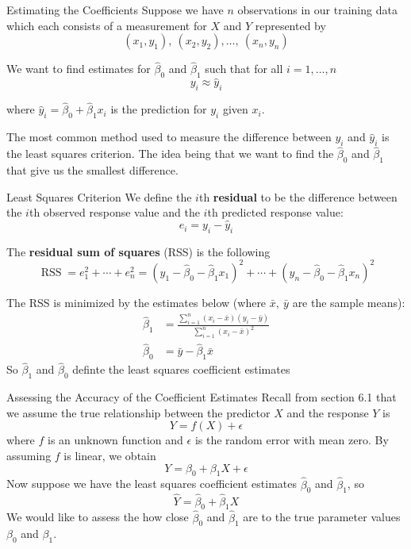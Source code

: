 \documentclass[
  ignorenonframetext,
  aspectratio=169,
]{beamer}
\begin{document}
\begin{frame}{Estimating the Coefficients}
\protect\hypertarget{estimating-the-coefficients}{}
Suppose we have \(n\) observations in our training data which each
consists of a measurement for \(X\) and \(Y\) represented by \[
(x_1, y_1),\ (x_2, y_2), \dots,\ (x_n, y_n)
\]

We want to find estimates for \(\hat \beta_0\) and \(\hat \beta_1\) such
that for all \(i = 1, \dots, n\) \[
y_i \approx \hat y_i
\]

where \(\hat y_i = \hat \beta_0 + \hat \beta_1 x_i\) is the prediction
for \(y_i\) given \(x_i\).

The most common method used to measure the difference between \(y_i\)
and \(\hat y_i\) is the least squares criterion. The idea being that
\alert{we want to find the $\hat \beta_0$ and $\hat \beta_1$ that give us the smallest difference}.
\end{frame}

\begin{frame}{Least Squares Criterion}
\protect\hypertarget{least-squares-criterion}{}
We define the \(i\)th \textbf{residual} to be the difference between the
\(i\)th observed response value and the \(i\)th predicted response
value: \[
e_i = y_i - \hat y_i
\]

The \textbf{residual sum of squares} (RSS) is the following \[
\operatorname{RSS} = e_1^2 + \cdots + e_n^2 
= \left(y_{1}-\hat{\beta}_{0}-\hat{\beta}_{1} x_{1}\right)^{2}+\cdots+\left(y_{n}-\hat{\beta}_{0}-\hat{\beta}_{1} x_{n}\right)^{2}
\]

\begin{block}{The RSS is minimized by the estimates below (where
\(\bar{x},\ \bar{y}\) are the sample means):}
\protect\hypertarget{the-rss-is-minimized-by-the-estimates-below-where-barx-bary-are-the-sample-means}{}
\[
\begin{aligned}
\hat{\beta}_{1}&=\frac{\sum_{i=1}^{n}\left(x_{i}-\bar{x}\right)\left(y_{i}-\bar{y}\right)}{\sum_{i=1}^{n}\left(x_{i}-\bar{x}\right)^{2}} \\
\hat{\beta}_{0}&=\bar{y}-\hat{\beta}_{1} \bar{x}
\end{aligned}
\]
\alert{So $\hat \beta_1$ and $\hat \beta_0$ definte the least squares coefficient estimates}
\end{block}
\end{frame}

\begin{frame}{Assessing the Accuracy of the Coefficient Estimates}
\protect\hypertarget{assessing-the-accuracy-of-the-coefficient-estimates}{}
Recall from section 6.1 that we assume the true relationship between the
predictor \(X\) and the response \(Y\) is \[
Y = f(X) + \epsilon
\] where \(f\) is an unknown function and \(\epsilon\) is the random
error with mean zero. By assuming \(f\) is linear, we obtain \[
Y = \beta_0 + \beta_1 X + \epsilon
\] Now suppose we have the least squares coefficient estimates
\(\hat \beta_0\) and \(\hat \beta_1\), so \[
\hat Y = \hat \beta_0 + \hat \beta_1 X
\] We would like to assess the how close \(\hat \beta_0\) and
\(\hat \beta_1\) are to the true parameter values \(\beta_0\) and
\(\beta_1\).
\end{frame}
\end{document}
